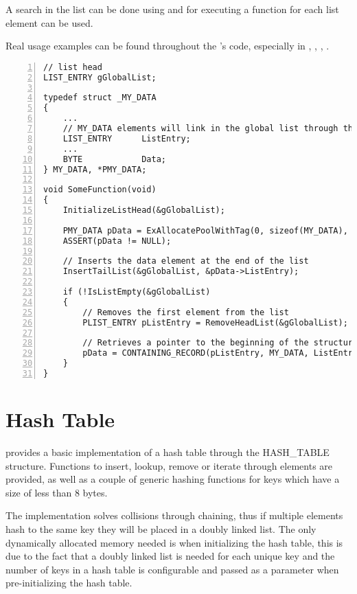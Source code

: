 \begin{appendices}
A search in the list can be done using  and for executing a function for
each list element  can be used.

Real usage examples can be found throughout the \projectname's code, especially in ,
, , .

\begin{lstlisting}[caption={List Usage Example},label={lst:ListExample},numbers=left]
// list head
LIST_ENTRY gGlobalList;

typedef struct _MY_DATA
{
	...
	// MY_DATA elements will link in the global list through the ListEntry field
	LIST_ENTRY		ListEntry;
	...
	BYTE			Data;
} MY_DATA, *PMY_DATA;

void SomeFunction(void)
{
	InitializeListHead(&gGlobalList);

	PMY_DATA pData = ExAllocatePoolWithTag(0, sizeof(MY_DATA), HEAP_TEST_TAG, 0);
	ASSERT(pData != NULL);

	// Inserts the data element at the end of the list
	InsertTailList(&gGlobalList, &pData->ListEntry);

	if (!IsListEmpty(&gGlobalList)
	{
		// Removes the first element from the list
		PLIST_ENTRY pListEntry = RemoveHeadList(&gGlobalList);

		// Retrieves a pointer to the beginning of the structure
		pData = CONTAINING_RECORD(pListEntry, MY_DATA, ListEntry);
	}
}
\end{lstlisting}

\section{Hash Table}

\projectname provides a basic implementation of a hash table through the HASH\_TABLE structure.
Functions to insert, lookup, remove or iterate through elements are provided, as well as a couple of
generic hashing functions for keys which have a size of less than 8 bytes.

The implementation solves collisions through chaining, thus if multiple elements hash to the same
key they will be placed in a doubly linked list. The only dynamically allocated memory needed is
when initializing the hash table, this is due to the fact that a doubly linked list is needed for
each unique key and the number of keys in a hash table is configurable and passed as a parameter
when pre-initializing the hash table.


\end{appendices}
